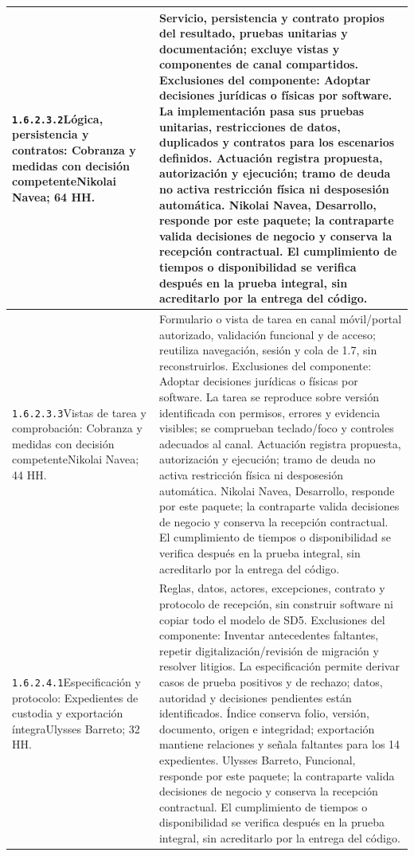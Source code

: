 \begin{longtable}{L{52mm}L{91mm}}
\texttt{1.\allowbreak{}6.\allowbreak{}2.\allowbreak{}3.\allowbreak{}2}\newline Lógica, persistencia y contratos: Cobranza y medidas con decisión competente\newline Nikolai Navea; 64 HH. & Servicio, persistencia y contrato propios del resultado, pruebas unitarias y documentación; excluye vistas y componentes de canal compartidos. Exclusiones del componente: Adoptar decisiones jurídicas o físicas por software. La implementación pasa sus pruebas unitarias, restricciones de datos, duplicados y contratos para los escenarios definidos. Actuación registra propuesta, autorización y ejecución; tramo de deuda no activa restricción física ni desposesión automática. Nikolai Navea, Desarrollo, responde por este paquete; la contraparte valida decisiones de negocio y conserva la recepción contractual. El cumplimiento de tiempos o disponibilidad se verifica después en la prueba integral, sin acreditarlo por la entrega del código.\\\hline
\texttt{1.\allowbreak{}6.\allowbreak{}2.\allowbreak{}3.\allowbreak{}3}\newline Vistas de tarea y comprobación: Cobranza y medidas con decisión competente\newline Nikolai Navea; 44 HH. & Formulario o vista de tarea en canal móvil/portal autorizado, validación funcional y de acceso; reutiliza navegación, sesión y cola de 1.7, sin reconstruirlos. Exclusiones del componente: Adoptar decisiones jurídicas o físicas por software. La tarea se reproduce sobre versión identificada con permisos, errores y evidencia visibles; se comprueban teclado/foco y controles adecuados al canal. Actuación registra propuesta, autorización y ejecución; tramo de deuda no activa restricción física ni desposesión automática. Nikolai Navea, Desarrollo, responde por este paquete; la contraparte valida decisiones de negocio y conserva la recepción contractual. El cumplimiento de tiempos o disponibilidad se verifica después en la prueba integral, sin acreditarlo por la entrega del código.\\\hline
\texttt{1.\allowbreak{}6.\allowbreak{}2.\allowbreak{}4.\allowbreak{}1}\newline Especificación y protocolo: Expedientes de custodia y exportación íntegra\newline Ulysses Barreto; 32 HH. & Reglas, datos, actores, excepciones, contrato y protocolo de recepción, sin construir software ni copiar todo el modelo de SD5. Exclusiones del componente: Inventar antecedentes faltantes, repetir digitalización/revisión de migración y resolver litigios. La especificación permite derivar casos de prueba positivos y de rechazo; datos, autoridad y decisiones pendientes están identificados. Índice conserva folio, versión, documento, origen e integridad; exportación mantiene relaciones y señala faltantes para los 14 expedientes. Ulysses Barreto, Funcional, responde por este paquete; la contraparte valida decisiones de negocio y conserva la recepción contractual. El cumplimiento de tiempos o disponibilidad se verifica después en la prueba integral, sin acreditarlo por la entrega del código.\\\hline

\end{longtable}
